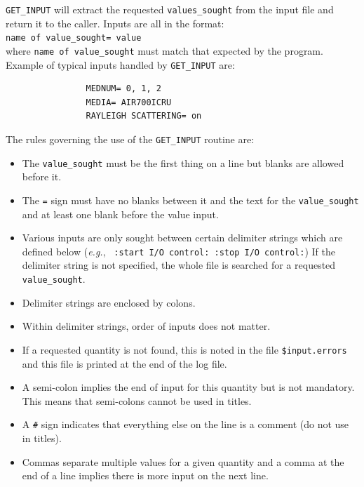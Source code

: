 \documentclass[12pt,twoside]{article}  %
\begin{document}
\verb+GET_INPUT+ will extract the requested
\verb+values_sought+ from the input file and return it to the
caller. Inputs are all in the format:\\
 \verb+name of value_sought= value+\\
where \verb+name of value_sought+ must match that expected by the
program.  Example of typical inputs handled by \verb+GET_INPUT+ are:
\begin{verbatim}
                MEDNUM= 0, 1, 2
                MEDIA= AIR700ICRU
                RAYLEIGH SCATTERING= on
\end{verbatim}
The rules governing the use of the {\tt GET\_INPUT} routine are:
\begin{itemize}
\item The \verb+value_sought+ must be the first thing on a line but
blanks are allowed before it.

\item The {\tt =} sign must have no blanks between it and the text for
the \verb+value_sought+ and at least one blank before the value input.

\item Various inputs are only sought between certain delimiter strings
which are defined below ({\em e.g.},
\verb+ :start I/O control: :stop I/O control:+)
If the delimiter string is not specified, the whole file is searched for
a requested \verb+value_sought+.

\item Delimiter strings are enclosed by colons.

\item Within delimiter strings, order of inputs does not matter.

\item If a requested quantity is not found, this is noted in the file
\verb+$input.errors+ and this file is printed at the end of the log file.

\item A semi-colon implies the end of input for this quantity but is
not mandatory.  This means that semi-colons cannot be used in titles.

\item A \verb+#+ sign indicates that everything else on the line is a
comment (do not use in titles).

\item Commas separate multiple values for a given quantity and a comma
at the end of a line implies there is more input on the next line.


\end{itemize}
\end{document}
